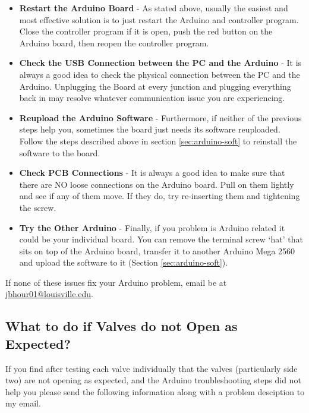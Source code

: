 \documentclass{article}
\begin{document}
\begin{itemize}
    \item \textbf{Restart the Arduino Board} - As stated above, usually the easiest and most effective solution is to just restart the Arduino and controller program. Close the controller
        program if it is open, push the red button on the Arduino board, then reopen the controller program.

    \item \textbf{Check the USB Connection between the PC and the Arduino} - It is always a good idea to check the physical connection between the PC and the Arduino. 
        Unplugging the Board at every junction and plugging everything back in may resolve whatever communication issue you are experiencing.

    \item \textbf{Reupload the Arduino Software} - Furthermore, if neither of the previous steps help you, sometimes the board just needs its software reuploaded. Follow the 
        steps described above in section \ref{sec:arduino-soft} to reinstall the software to the board. 

    \item \textbf{Check PCB Connections} - It is always a good idea to make sure that there are NO loose connections on the Arduino board. Pull on them lightly and 
        see if any of them move. If they do, try re-inserting them and tightening the screw. 
    
    \item \textbf{Try the Other Arduino} - Finally, if you problem is Arduino related it could be your individual board. You can remove the terminal screw `hat' that sits on top of the 
        Arduino board, transfer it to another Arduino Mega 2560 and upload the software to it (Section \ref{sec:arduino-soft}). 
\end{itemize}

If none of these issues fix your Arduino problem, email be at \url{jbhour01@louisville.edu}.

\subsection{What to do if Valves do not Open as Expected?}
If you find after testing each valve individually that the valves (particularly side two) are not opening as expected, and the Arduino troubleshooting steps did not help you 
please send the following information along with a problem desciption to my email.
\end{document}
